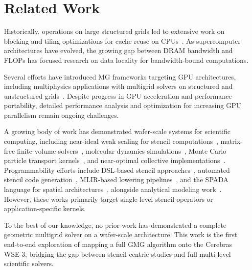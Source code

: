 \documentclass[conference]{IEEEtran}
\begin{document}
    
    \section{Related Work}
    
    Historically, operations on large structured grids led to extensive work on blocking and tiling optimizations for cache reuse on CPUs~\cite{Nguyen:2010:BOS:1884643.1884658,Zhou:2012,Yount:2016:YSK:3019129.3019133,Unat2016,Devito}. As supercomputer architectures have evolved, the growing gap between DRAM bandwidth and FLOPs has focused research on data locality for bandwidth-bound computations.
    
    Several efforts have introduced MG frameworks targeting GPU architectures, including multiphysics applications with multigrid solvers on structured and unstructured grids~\cite{Amrex,Anderson,Grete,mali}. Despite progress in GPU acceleration and performance portability, detailed performance analysis and optimization for increasing GPU parallelism remain ongoing challenges.
    
    A growing body of work has demonstrated wafer-scale systems for scientific computing, including near-ideal weak scaling for stencil computations~\cite{scalable_25pt_stencil,Rocki,mathias,Sai,sai2}, matrix-free finite-volume solvers~\cite{sai_fv_arxiv,Ltaief}, molecular dynamics simulations~\cite{perez_md_sc24,perez-journal}, Monte Carlo particle transport kernels~\cite{Tramm24,Yoshii26}, and near-optimal collective implementations~\cite{luczynski_reduce}. Programmability efforts include DSL-based stencil approaches~\cite{brown}, automated stencil code generation~\cite{sai_codegen_sc24}, MLIR-based lowering pipelines~\cite{stawinoga_mlir_stencils_wse}, and the SPADA language for spatial architectures~\cite{spada}, alongside analytical modeling work~\cite{gianinazzi_spatialcomputer,gianinazzi2025energy,baumann2024low,luczynski_reduce}. However, these works primarily target single-level stencil operators or application-specific kernels.
    
    To the best of our knowledge, no prior work has demonstrated a complete geometric multigrid solver on a wafer-scale architecture. This work is the first end-to-end exploration of mapping a full GMG algorithm onto the Cerebras WSE-3, bridging the gap between stencil-centric studies and full multi-level scientific solvers.
\end{document}
